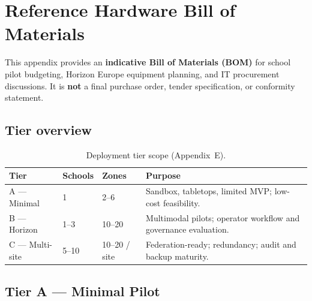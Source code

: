 \section{Reference Hardware Bill of Materials}
\label{app:hardware-bom}
\label{sec:hardware-procurement-bom}

This appendix provides an \textbf{indicative Bill of Materials (BOM)} for school pilot budgeting,
Horizon Europe equipment planning, and IT procurement discussions.
It is \textbf{not} a final purchase order, tender specification, or conformity statement.

\smallskip
\noindent{}

\subsection{Tier overview}

\begin{table}[htbp]
  \centering
  \caption{Deployment tier scope (Appendix~E).}
  \label{tab:bom-tier-overview}
  \small
  \begin{tabular}{@{}p{2.2cm}p{2.0cm}p{2.0cm}p{5.8cm}@{}}
    \toprule
    Tier & Schools & Zones & Purpose \\
    \midrule
    A --- Minimal & 1 & 2--6 &
      Sandbox, tabletops, limited MVP; low-cost feasibility. \\
    B --- Horizon & 1--3 & 10--20 &
      Multimodal pilots; operator workflow and governance evaluation. \\
    C --- Multi-site & 5--10 & 10--20 / site &
      Federation-ready; redundancy; audit and backup maturity. \\
    \bottomrule
  \end{tabular}
\end{table}

\subsection{Tier A --- Minimal Pilot}

